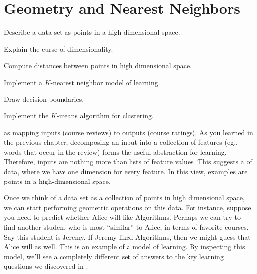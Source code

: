 \chapter{Geometry and Nearest Neighbors} \label{sec:knn}



\begin{learningobjectives}
\item Describe a data set as points in a high dimensional space.
\item Explain the curse of dimensionality.
\item Compute distances between points in high dimensional space.
\item Implement a $K$-nearest neighbor model of learning.
\item Draw decision boundaries.
\item Implement the $K$-means algorithm for clustering.
\end{learningobjectives}


 as mapping inputs
(course reviews) to outputs (course ratings).  As you learned in the
previous chapter, decomposing an input into a collection of features
(eg., words that occur in the review) forms the useful abstraction for
learning.  Therefore, inputs are nothing more than lists of feature
values.  This suggests a  of data, where we
have one dimension for every feature.  In this view, examples are
points in a high-dimensional space.

Once we think of a data set as a collection of points in high
dimensional space, we can start performing geometric operations on
this data.  For instance, suppose you need to predict whether Alice
will like Algorithms.  Perhaps we can try to find another student who
is most ``similar'' to Alice, in terms of favorite courses.  Say this
student is Jeremy.  If Jeremy liked Algorithms, then we might guess
that Alice will as well.  This is an example of a  model of learning.  By inspecting this model, we'll see a
completely different set of answers to the key learning questions we
discovered in .

